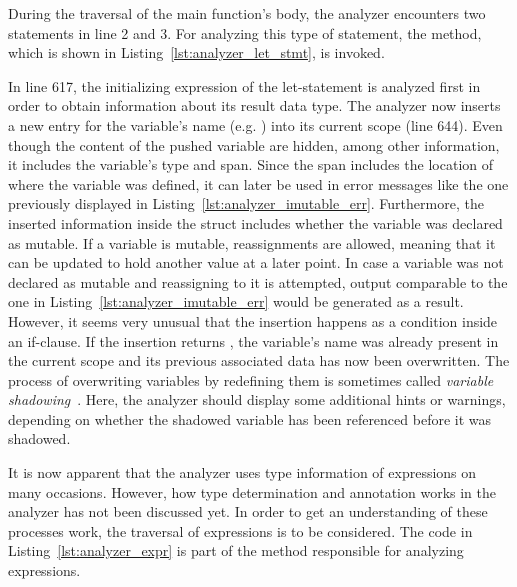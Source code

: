During the traversal of the main function's body, the analyzer encounters two  statements in line 2 and 3.
For analyzing this type of statement, the  method, which is shown in Listing~\ref{lst:analyzer_let_stmt}, is invoked.


In line 617, the initializing expression of the let-statement is analyzed first in order to obtain information about its result data type.
The analyzer now inserts a new entry for the variable's name (e.g. ) into its current scope (line 644).
Even though the content of the pushed variable are hidden, among other information, it includes the variable's type and span.
Since the span includes the location of where the variable was defined, it can later be used in error messages like the one previously displayed in Listing~\ref{lst:analyzer_imutable_err}.
Furthermore, the inserted information inside the struct includes whether the variable was declared as mutable.
If a variable is mutable, reassignments are allowed, meaning that it can be updated to hold another value at a later point.
In case a variable was not declared as mutable and reassigning to it is attempted,
output comparable to the one in Listing~\ref{lst:analyzer_imutable_err} would be generated as a result.
However, it seems very unusual that the insertion happens as a condition inside an if-clause.
If the insertion returns , the variable's name was already present in the current scope and its previous associated data has now been overwritten.
The process of overwriting variables by redefining them is sometimes called \emph{variable shadowing}~\cite[p.~34]{Klabnik2019}.
Here, the analyzer should display some additional hints or warnings, depending on whether the shadowed variable has been referenced before it was shadowed.

It is now apparent that the analyzer uses type information of expressions on many occasions.
However, how type determination and annotation works in the analyzer has not been discussed yet.
In order to get an understanding of these processes work, the traversal of expressions is to be considered.
The code in Listing~\ref{lst:analyzer_expr} is part of the method responsible for analyzing expressions.


